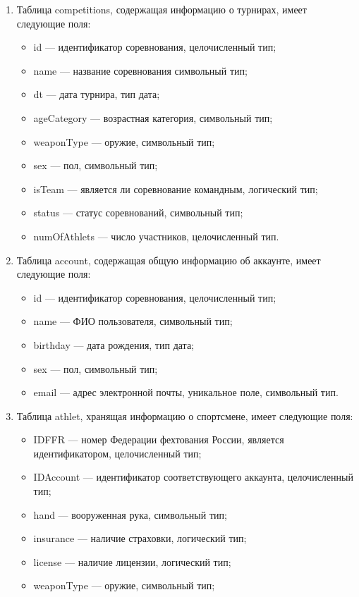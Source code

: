 \begin{enumerate}
	\item Таблица competitions, содержащая информацию о турнирах, имеет следующие поля:
	\begin{itemize}
		\item id --- идентификатор соревнования, целочисленный тип;
		\item name --- название соревнования символьный тип;
		\item dt --- дата турнира, тип дата;
		\item ageCategory --- возрастная категория, символьный тип;
		\item weaponType --- оружие, символьный тип;
		\item sex --- пол, символьный тип;
		\item isTeam --- является ли соревнование командным, логический тип;
		\item status --- статус соревнований, символьный тип;
		\item numOfAthlets --- число участников, целочисленный тип.
	\end{itemize}
	\item Таблица account, содержащая общую информацию об аккаунте, имеет следующие поля:
	\begin{itemize}
		\item id --- идентификатор соревнования, целочисленный тип;
		\item name --- ФИО пользователя, символьный тип;
		\item birthday --- дата рождения, тип дата;
		\item sex --- пол, символьный тип;
		\item email --- адрес электронной почты, уникальное поле, символьный тип.
	\end{itemize}
	\item Таблица athlet, хранящая информацию о спортсмене, имеет следующие поля:
	\begin{itemize}
		\item IDFFR --- номер Федерации фехтования России, является идентификатором, целочисленный тип;
		\item IDAccount --- идентификатор соответствующего аккаунта, целочисленный тип;
		\item hand --- вооруженная рука, символьный тип;
		\item insurance --- наличие страховки, логический тип;
		\item license --- наличие лицензии, логический тип;
		\item weaponType --- оружие, символьный тип;

\end{itemize}
\end{enumerate}
